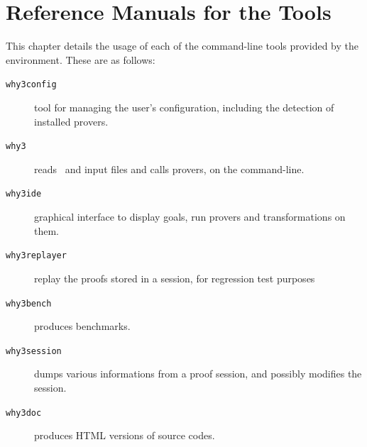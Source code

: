 \chapter{Reference Manuals for the \why Tools}
\label{chap:manpages}

This chapter details the usage of each of the command-line tools
provided by the \why environment. These are as follows:
\begin{description}
\item[\texttt{why3config}] tool for managing the user's configuration,
  including the detection of installed provers.
\item[\texttt{why3}] reads \why\ and \whyml input files and calls
  provers, on the command-line.
\item[\texttt{why3ide}] graphical interface to display goals, run
  provers and transformations on them.
\item[\texttt{why3replayer}] replay the proofs stored in a session,
  for regression test purposes
\item[\texttt{why3bench}] produces benchmarks.
\item[\texttt{why3session}] dumps various informations from a proof
  session, and possibly modifies the session.
\item[\texttt{why3doc}] produces HTML versions of \why source codes.
\end{description}

